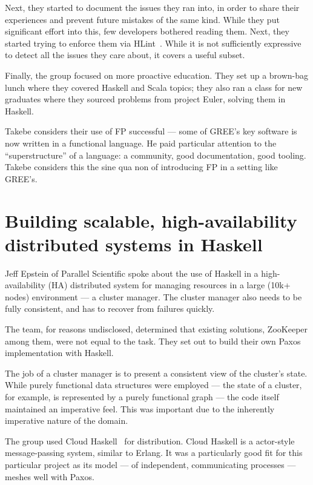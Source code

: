 \documentclass{jfp1}
\begin{document}
Next, they started to document the issues they ran into, in order to
share their experiences and prevent future mistakes of the same kind.
While they put significant effort into this, few developers bothered
reading them. Next, they started trying to enforce them via
HLint~\cite{Mitchell:2014:HLint}. While it is not sufficiently
expressive to detect all the issues they care about, it covers a
useful subset.

Finally, the group focused on more proactive education. They set up a
brown-bag lunch where they covered Haskell and Scala topics; they also
ran a class for new graduates where they sourced problems from project
Euler, solving them in Haskell.

Takebe considers their use of FP successful --- some of GREE's key
software is now written in a functional language. He paid particular
attention to the ``superstructure'' of a language: a community, good
documentation, good tooling. Takebe considers this the sine qua non
of introducing FP in a setting like GREE's.

\section{Building scalable, high-availability distributed systems in Haskell}


Jeff Epstein of Parallel Scientific spoke about the use of Haskell in
a high-availability (HA) distributed system for managing resources in
a large (10k+ nodes) environment --- a cluster manager. The cluster
manager also needs to be fully consistent, and has to recover from
failures quickly.

The team, for reasons undisclosed, determined that existing solutions,
ZooKeeper among them, were not equal to the task. They set out to
build their own Paxos~\cite{Lamport:1998:Part} implementation with Haskell.

The job of a cluster manager is to present a consistent view of the
cluster's state. While purely functional data structures were employed
--- the state of a cluster, for example, is represented by a purely
functional graph --- the code itself maintained an imperative feel.
This was important due to the inherently imperative nature of the
domain.

The group used Cloud Haskell~\cite{Epstein:2011:Towards} for
distribution. Cloud Haskell is a actor-style message-passing system,
similar to Erlang. It was a particularly good fit for this particular
project as its model --- of independent, communicating processes ---
meshes well with Paxos.
\end{document}
